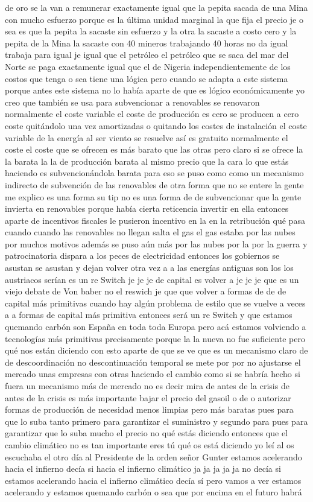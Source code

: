 de oro se la van a remunerar exactamente igual que la pepita sacada de una Mina con mucho esfuerzo porque es la última unidad marginal la que fija el precio je o sea es que la pepita la sacaste sin esfuerzo y la otra la sacaste a costo cero y la pepita de la Mina la sacaste con 40 mineros trabajando 40 horas no da igual trabaja para igual je igual que el petróleo el petróleo que se saca del mar del Norte se paga exactamente igual que el de Nigeria independientemente de los costos que tenga o sea tiene una lógica pero cuando se adapta a este sistema porque antes este sistema no lo había aparte de que es lógico económicamente yo creo que también se usa para subvencionar a renovables se renovaron normalmente el coste variable el coste de producción es cero se producen a cero coste quitándolo una vez amortizadas o quitando los costes de instalación el coste variable de la energía al ser viento se resuelve así es gratuito normalmente el coste el coste que se ofrecen es más barato que las otras pero claro si se ofrece la la barata la la de producción barata al mismo precio que la cara lo que estás haciendo es subvencionándola barata para eso se puso como como un mecanismo indirecto de subvención de las renovables de otra forma que no se entere la gente me explico es una forma su tip no es una forma de de subvencionar que la gente invierta en renovables porque había cierta reticencia invertir en ella entonces aparte de incentivos fiscales le pusieron incentivo en la en la retribución qué pasa cuando cuando las renovables no llegan salta el gas el gas estaba por las nubes por muchos motivos además se puso aún más por las nubes por la por la guerra y patrocinatoria dispara a los peces de electricidad entonces los gobiernos se asustan se asustan y dejan volver otra vez a a las energías antiguas son los los austriacos serían es un re Switch je je je de capital es volver a je je je que es un viejo debate de Von baber no el reswich je que que volver a formas de de de capital más primitivas cuando hay algún problema de estilo que se vuelve a veces a a formas de capital más primitiva entonces será un re Switch y que estamos quemando carbón son España en toda toda Europa pero acá estamos volviendo a tecnologías más primitivas precisamente porque la la nueva no fue suficiente pero qué nos están diciendo con esto aparte de que se ve que es un mecanismo claro de de descoordinación no descontinuación temporal se mete por por no ajustarse el mercado unas empresas con otras haciendo el cambio como si se habría hecho si fuera un mecanismo más de mercado no es decir mira de antes de la crisis de antes de la crisis es más importante bajar el precio del gasoil o de o autorizar formas de producción de necesidad menos limpias pero más baratas pues para que lo suba tanto primero para garantizar el suministro y segundo para pues para garantizar que lo suba mucho el precio no qué estás diciendo entonces que el cambio climático no es tan importante eres tú qué os está diciendo yo leí al os escuchaba el otro día al Presidente de la orden señor Gunter estamos acelerando hacia el infierno decía si hacia el infierno climático ja ja ja ja ja no decía si estamos acelerando hacia el infierno climático decía sí pero vamos a ver estamos acelerando y estamos quemando carbón o sea que por encima en el futuro habrá 